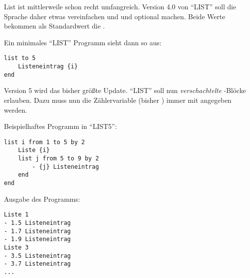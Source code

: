 \documentclass[fontsize=10pt, a4paper, ngerman]{scrartcl}
\begin{document}
\begin{aufgabe}[subtitle=list 4.0]
	\label{aufg:list-v4}
	List ist mittlerweile schon recht umfangreich. Version 4.0 von \enquote{LIST} soll die
	Sprache daher etwas vereinfachen und  und 
	optional machen. Beide Werte bekommen als Standardwert die .

	Ein minimales \enquote{LIST} Programm sieht dann so aus:
	\begin{verbatim}
list to 5
    Listeneintrag {i}
end
	\end{verbatim}
\end{aufgabe}

\begin{aufgabe}[subtitle=list 5.0]
	\label{aufg:list-v5}
	Version 5 wird das bisher größte Update. \enquote{LIST} soll nun \emph{verschachtelte}
	-Blöcke erlauben. Dazu muss nun die Zählervariable (bisher ) immer
	mit angegeben werden.

	\begin{minipage}[t]{.6\textwidth}
		Beispielhaftes Programm in \enquote{LIST5}:
		\begin{verbatim}
list i from 1 to 5 by 2
    Liste {i}
    list j from 5 to 9 by 2
        - {j} Listeneintrag
    end
end
		\end{verbatim}
		\end{minipage}\hfill\begin{minipage}[t]{.4\textwidth}
		Ausgabe des Programms:
		\begin{verbatim}
Liste 1
- 1.5 Listeneintrag
- 1.7 Listeneintrag
- 1.9 Listeneintrag
Liste 3
- 3.5 Listeneintrag
- 3.7 Listeneintrag
...
		\end{verbatim}
	\end{minipage}

\end{aufgabe}
\end{document}

